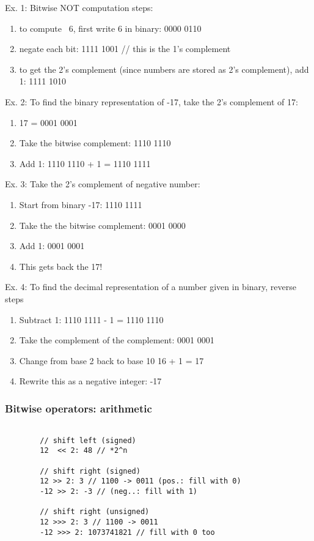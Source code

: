 \documentclass{scrartcl}
\begin{document}
    Ex. 1: Bitwise NOT computation steps:

    \begin{enumerate}
        \item to compute ~6, first write 6 in binary: 0000 0110
        \item negate each bit: 1111 1001 // this is the 1's complement
        \item to get the 2's complement (since numbers are stored as 2’s complement), add 1: 1111 1010
    \end{enumerate}

    Ex. 2: To find the binary representation of -17, take the 2's complement of 17:

    \begin{enumerate}
        \item 17 = 0001 0001
        \item Take the bitwise complement: 1110 1110
        \item Add 1: 1110 1110 + 1 = 1110 1111
    \end{enumerate}

    Ex. 3: Take the 2's complement of negative number:
    \begin{enumerate}
        \item Start from binary -17: 1110 1111
        \item     Take the the bitwise complement: 0001 0000
        \item     Add 1: 0001 0001
        \item     This gets back the 17!
    \end{enumerate}

    Ex. 4: To find the decimal representation of a number given in binary, reverse steps
   \begin{enumerate}
       \item  Subtract 1: 1110 1111 - 1 = 1110 1110
       \item     Take the complement of the complement: 0001 0001
       \item     Change from base 2 back to base 10 16 + 1 = 17
       \item     Rewrite this as a negative integer: -17
   \end{enumerate}

\subsubsection{Bitwise operators: arithmetic}
    \begin{lstlisting}

        // shift left (signed)
        12  << 2: 48 // *2^n

        // shift right (signed)
        12 >> 2: 3 // 1100 -> 0011 (pos.: fill with 0)
        -12 >> 2: -3 // (neg..: fill with 1)

        // shift right (unsigned)
        12 >>> 2: 3 // 1100 -> 0011
        -12 >>> 2: 1073741821 // fill with 0 too
    \end{lstlisting}
\end{document}
